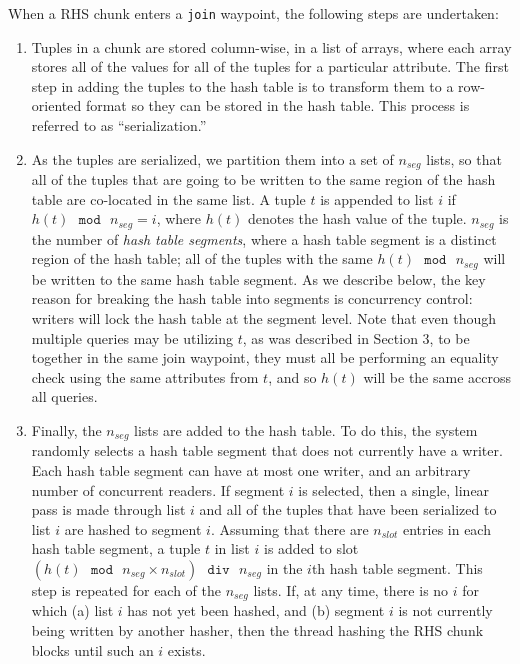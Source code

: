 \documentclass{sig-alternate}
\renewcommand\:{\colon} %
\begin{document}
When a RHS chunk enters a \texttt{join} waypoint, the following steps are undertaken:

\begin{enumerate}

\item 
Tuples in a chunk
are stored column-wise, in a list of arrays, where each array stores all of the values for all of the tuples
for a particular
attribute.  The
first step in adding the tuples to the hash
table is to transform them to a row-oriented format so they can be stored in the hash table.
This process is referred to as ``serialization.''

\item
As the tuples are serialized,  we partition them into a set of
$n_{seg}$ lists, so that all of the tuples that are going to be written 
to the same region of the hash table are co-located in the same list.
A tuple $t$ is appended to list $i$ if
$h(t) \textrm{ }\texttt{mod}\textrm{ } n_{seg} = i$, 
where $h(t)$ denotes the hash value of the tuple. 
$n_{seg}$ is the number of \emph{hash table segments},
where a hash table segment is a distinct region of the hash table; all of the tuples with the
same $h(t) \textrm{ }\texttt{mod}\textrm{ } n_{seg}$ will be written to the same hash table segment.
As we describe below, the key reason for breaking the hash table into segments is concurrency control: 
writers will lock the hash table at the segment level.
Note that even though multiple queries may be utilizing $t$, as was described in Section 3,
to be together in the same join
waypoint, they must all be performing an equality check using the same attributes from $t$, and so $h(t)$ will
be the same accross all queries.

\item
Finally, the $n_{seg}$ lists are added to the hash table.  To do this, the system
randomly selects a hash table segment that does not currently have a writer.  
Each hash table segment can have at most one writer, and an arbitrary number of concurrent readers.  
If segment $i$ is selected, then a single, linear
pass is made through list $i$ and all of the tuples 
that have been serialized to list $i$ are hashed to segment $i$.
Assuming that there are $n_{slot}$ entries in each hash table segment, a tuple $t$ in list $i$ is 
added to slot $(h(t) \textrm{ }\texttt{mod}\textrm{ } n_{seg} \times n_{slot}) \textrm{ }\texttt{div}\textrm{ } n_{seg}$ in the $i$th hash table segment.
This step is repeated for each of the $n_{seg}$ lists.  If, at any time, there is no $i$ for which (a) list $i$ has not yet been
hashed, and (b) segment $i$ is not currently being written by another hasher, then the thread hashing the
RHS chunk blocks until such an $i$ exists.

\end{enumerate}
\end{document}
